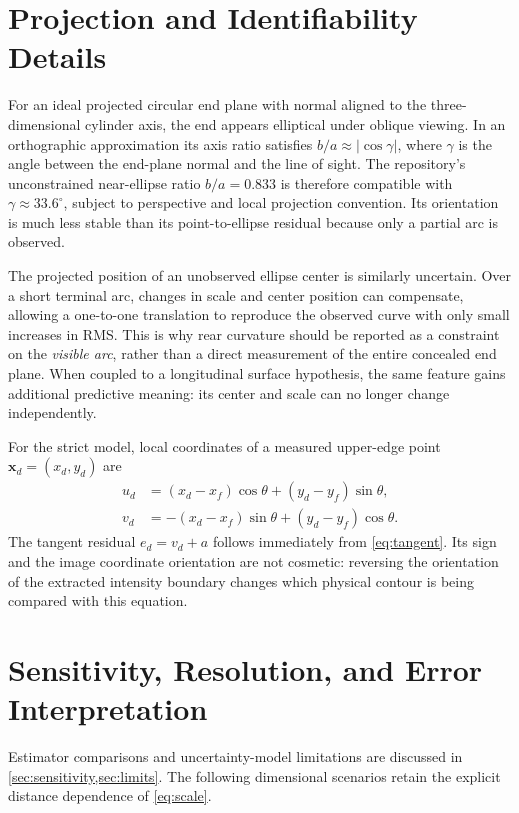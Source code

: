 \documentclass[11pt,letterpaper]{article}
\newcommand{\mat}[1]{\mathbf{#1}}
\begin{document}
\section{Projection and Identifiability Details}
\label{app:projection}

For an ideal projected circular end plane with normal aligned to the three-dimensional cylinder axis, the end appears elliptical under oblique viewing. In an orthographic approximation its axis ratio satisfies \(b/a\approx|\cos\gamma|\), where \(\gamma\) is the angle between the end-plane normal and the line of sight. The repository's unconstrained near-ellipse ratio \(b/a=0.833\) is therefore compatible with \(\gamma\approx33.6^\circ\), subject to perspective and local projection convention. Its orientation is much less stable than its point-to-ellipse residual because only a partial arc is observed.

The projected position of an unobserved ellipse center is similarly uncertain. Over a short terminal arc, changes in scale and center position can compensate, allowing a one-to-one translation to reproduce the observed curve with only small increases in RMS. This is why rear curvature should be reported as a constraint on the \emph{visible arc}, rather than a direct measurement of the entire concealed end plane. When coupled to a longitudinal surface hypothesis, the same feature gains additional predictive meaning: its center and scale can no longer change independently.

For the strict model, local coordinates of a measured upper-edge point \(\mat x_d=(x_d,y_d)\) are
\begin{align}
 u_d&=(x_d-x_f)\cos\theta+(y_d-y_f)\sin\theta,\\
 v_d&=-(x_d-x_f)\sin\theta+(y_d-y_f)\cos\theta.
\end{align}
The tangent residual \(e_d=v_d+a\) follows immediately from \cref{eq:tangent}. Its sign and the image coordinate orientation are not cosmetic: reversing the orientation of the extracted intensity boundary changes which physical contour is being compared with this equation.

\section{Sensitivity, Resolution, and Error Interpretation}
\label{app:error}

Estimator comparisons and uncertainty-model limitations are discussed in \cref{sec:sensitivity,sec:limits}. The following dimensional scenarios retain the explicit distance dependence of \cref{eq:scale}.
\end{document}

